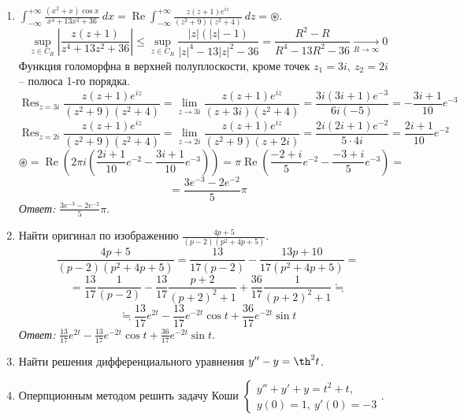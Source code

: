 \documentclass[14pt, a4paper, titlepage, fleqn]{extarticle}
\DeclareMathOperator*{\res}{Res}
\DeclareMathOperator{\Rez}{Re}
\begin{document}
\begin{enumerate}
            \item \( \int_{-\infty}^{+\infty} \frac{(x^2+x) \cos x}{x^4+13x^2+36} ~ dx = \Rez \int_{-\infty}^{+\infty} \frac{z(z+1) e^{iz}}{(z^2+9)(z^2+4)} ~ dz = \circledast \).
            \[
                \sup_{z\in C_R} \left| \frac{z(z+1)}{z^4+13z^2+36} \right| \leq \sup_{z\in C_R} \frac{|z|(|z|-1)}{|z|^4-13|z|^2-36} = \frac{R^2-R}{R^4-13R^2-36} \xrightarrow[R \to \infty]{} 0
            \]
            Функция голоморфна в верхней полуплоскости, кроме точек \( z_1 = 3i, ~ z_2 = 2i \) -- полюса 1-го порядка.
            \[
                \res_{z=3i} \frac{z(z+1) e^{iz}}{(z^2+9)(z^2+4)} = \lim_{z\to 3i} \frac{z(z+1)e^{iz}}{(z+3i)(z^2+4)} = \frac{3i(3i+1) e^{-3}}{6i (-5)} = -\frac{3i+1}{10} e^{-3}
            \]
            \[
                \res_{z=2i} \frac{z(z+1) e^{iz}}{(z^2+9)(z^2+4)} = \lim_{z\to 2i} \frac{z(z+1)e^{iz}}{(z^2+9)(z+2i)} = \frac{2i(2i+1) e^{-2}}{5\cdot 4i} = \frac{2i+1}{10} e^{-2}
            \]
            \[
                \circledast = \Rez \left( 2 \pi i \left( \frac{2i+1}{10} e^{-2} - \frac{3i+1}{10} e^{-3} \right) \right) = \pi \Rez \left( \frac{-2 + i}{5}e^{-2} - \frac{-3+i}{5}e^{-3} \right) =
            \]
            \[
                = \frac{3e^{-3} - 2e^{-2}}{5} \pi
            \]
            \textit{Ответ:} \( \frac{3e^{-3} - 2e^{-2}}{5} \pi \).
            
            \item Найти оригинал по изображению \( \frac{4p+5}{(p-2)(p^2+4p+5)} \).
            \[
                \frac{4p+5}{(p-2)(p^2+4p+5)} = \frac{13}{17(p-2)} - \frac{13p+10}{17(p^2+4p+5)} = 
            \]
            \[
                = \frac{13}{17} \frac{1}{(p-2)} - \frac{13}{17} \frac{p+2}{(p+2)^2 + 1} + \frac{36}{17}\frac{1}{(p+2)^2 + 1} \fallingdotseq
            \]
            \[
                \fallingdotseq \frac{13}{17} e^{2t} - \frac{13}{17} e^{-2t} \cos t + \frac{36}{17} e^{-2t} \sin t
            \]
            \textit{Ответ:} \( \frac{13}{17} e^{2t} - \frac{13}{17} e^{-2t} \cos t + \frac{36}{17} e^{-2t} \sin t \).

            \item Найти решения дифференциального уравнения \( y'' - y = \th^2 t \).
            
            \item Оперпционным методом решить задачу Коши \( \begin{cases}
                y'' + y' + y = t^2 + t, \\
                y(0)=1, ~ y'(0) = -3
            \end{cases}  \).


\end{enumerate}
\end{document}
